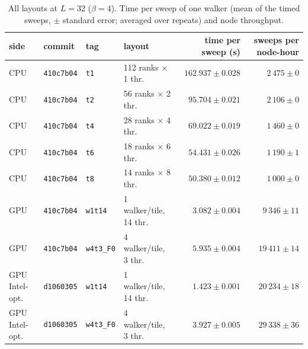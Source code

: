 \begin{table}[h]\centering\small
\caption{All layouts at $L=32$ ($\beta=4$). Time per sweep of one walker (mean of the timed sweeps, $\pm$ standard error; averaged over repeats) and node throughput.}
\begin{tabular}{@{}llllrr@{}}\toprule
side & commit & tag & layout & time per sweep (s) & sweeps per node-hour\\\midrule
CPU & \texttt{410c7b04} & \texttt{t1} & 112 ranks $\times$ 1 thr. & $162.937 \pm 0.028$ & $2\,475 \pm 0$\\
CPU & \texttt{410c7b04} & \texttt{t2} & 56 ranks $\times$ 2 thr. & $95.704 \pm 0.021$ & $2\,106 \pm 0$\\
CPU & \texttt{410c7b04} & \texttt{t4} & 28 ranks $\times$ 4 thr. & $69.022 \pm 0.019$ & $1\,460 \pm 0$\\
CPU & \texttt{410c7b04} & \texttt{t6} & 18 ranks $\times$ 6 thr. & $54.431 \pm 0.026$ & $1\,190 \pm 1$\\
CPU & \texttt{410c7b04} & \texttt{t8} & 14 ranks $\times$ 8 thr. & $50.380 \pm 0.012$ & $1\,000 \pm 0$\\
GPU & \texttt{410c7b04} & \texttt{w1t14} & 1 walker/tile, 14 thr. & $3.082 \pm 0.004$ & $9\,346 \pm 11$\\
GPU & \texttt{410c7b04} & \texttt{w4t3\_F0} & 4 walker/tile, 3 thr. & $5.935 \pm 0.004$ & $19\,411 \pm 14$\\
GPU Intel-opt. & \texttt{d1060305} & \texttt{w1t14} & 1 walker/tile, 14 thr. & $1.423 \pm 0.001$ & $20\,234 \pm 18$\\
GPU Intel-opt. & \texttt{d1060305} & \texttt{w4t3\_F0} & 4 walker/tile, 3 thr. & $3.927 \pm 0.005$ & $29\,338 \pm 36$\\
\bottomrule\end{tabular}\end{table}
